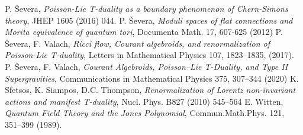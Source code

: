 \documentclass[a4paper]{amsart}
\theoremstyle{plain}
\theoremstyle{definition}
\begin{document}
\begin{thebibliography}{99}
 P. Ševera, \emph{Poisson-Lie T-duality as a boundary phenomenon of Chern-Simons theory}, JHEP 1605 (2016) 044.
 P. Ševera, \emph{Moduli spaces of flat connections and Morita
equivalence of quantum tori},  Documenta Math. 17, 607-625 (2012)
 P. \v Severa, F. Valach, \emph{Ricci flow, Courant algebroids, and renormalization of Poisson-Lie T-duality}, Letters in Mathematical Physics 107, 1823–1835, (2017).
 P. Ševera, F. Valach, \emph{Courant Algebroids, Poisson–Lie T-Duality, and Type II Supergravities}, Communications in Mathematical Physics 375, 307–344 (2020)
 K. Sfetsos, K. Siampos, D.C. Thompson, \emph{Renormalization of Lorentz
non-invariant actions and manifest T-duality}, Nucl. Phys. B827 (2010) 545--564
 E. Witten, \emph{Quantum Field Theory and the Jones Polynomial}, Commun.Math.Phys. 121, 351–399 (1989).


\end{thebibliography}
\end{document}
